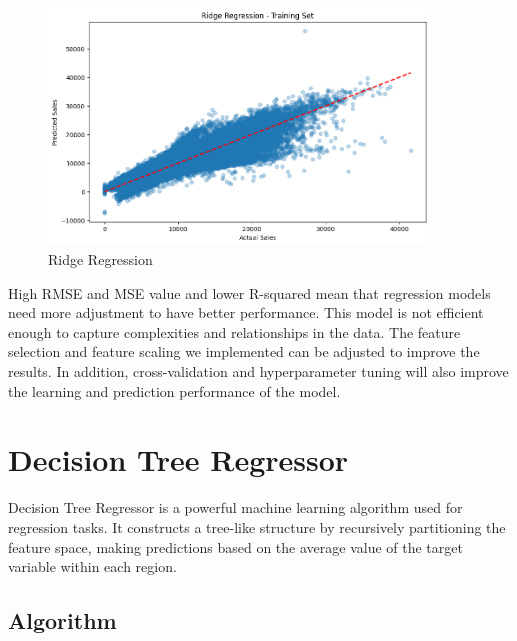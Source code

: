 \documentclass[12pt]{report}
\begin{document}
\begin{figure}[H]
    \vspace{0.5cm} %
    \begin{minipage}{0.6\textwidth}
        \centering
        \includegraphics[width=0.9\textwidth]{ridge.png}
        \caption{Ridge Regression}
        \label{ridge} %
    \end{minipage}
    
 
\end{figure}

High RMSE and MSE value and lower R-squared mean that regression models need more adjustment to have better performance. This model is not efficient enough to capture complexities and relationships in the data. The feature selection and feature scaling we implemented can be adjusted to improve the results. In addition, cross-validation and hyperparameter tuning will also improve the learning and prediction performance of the model.


\section{Decision Tree Regressor}

Decision Tree Regressor is a powerful machine learning algorithm used for regression tasks. It constructs a tree-like structure by recursively partitioning the feature space, making predictions based on the average value of the target variable within each region.

\subsection{Algorithm}
\end{document}
